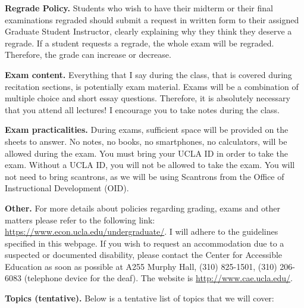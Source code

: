 \documentclass[]{book}
\theoremstyle{definition}
\theoremstyle{definition}
\theoremstyle{definition}
\theoremstyle{remark}
\begin{document}
\textbf{Regrade Policy.} Students who wish to have their midterm or
their final examinations regraded should submit a request in written
form to their assigned Graduate Student Instructor, clearly explaining
why they think they deserve a regrade. If a student requests a regrade,
the whole exam will be regraded. Therefore, the grade can increase or
decrease.

\textbf{Exam content.} Everything that I say during the class, that is
covered during recitation sections, is potentially exam material. Exams
will be a combination of multiple choice and short essay questions.
Therefore, it is absolutely necessary that you attend all lectures! I
encourage you to take notes during the class.

\textbf{Exam practicalities.} During exams, sufficient space will be
provided on the sheets to answer. No notes, no books, no smartphones, no
calculators, will be allowed during the exam. You must bring your UCLA
ID in order to take the exam. Without a UCLA ID, you will not be allowed
to take the exam. You will not need to bring scantrons, as we will be
using Scantrons from the Office of Instructional Development (OID).

\textbf{Other.} For more details about policies regarding grading, exams
and other matters please refer to the following link:
\url{https://www.econ.ucla.edu/undergraduate/}. I will adhere to the
guidelines specified in this webpage. If you wish to request an
accommodation due to a suspected or documented disability, please
contact the Center for Accessible Education as soon as possible at A255
Murphy Hall, (310) 825-1501, (310) 206-6083 (telephone device for the
deaf). The website is \url{http://www.cae.ucla.edu/}.

\textbf{Topics (tentative).} Below is a tentative list of topics that we
will cover:
\end{document}
